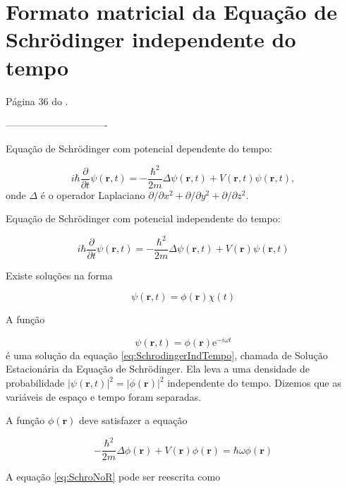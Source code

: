 \chapter{Formato matricial da Equação de Schrödinger independente do tempo}

Página 36 do \cite{Cohen1}.

-------------------------------

Equação de Schrödinger com potencial dependente do tempo:
	
	\begin{equation}
		i\hbar\frac{\partial}{\partial t} \psi(\textbf{r},t) =  - \frac{\hbar^2}{2m}\Delta\psi(\textbf{r},t) + V(\textbf{r},t)\psi(\textbf{r},t),
	\end{equation}
	onde $\Delta$ é o operador Laplaciano $\partial / \partial x^2 + \partial / \partial y^2 + \partial / \partial z^2$.
	
	
	Equação de Schrödinger com potencial independente do tempo:
	
	\begin{equation}\label{eq:SchrodingerIndTempo}
		i\hbar\frac{\partial}{\partial t} \psi(\textbf{r},t) =  - \frac{\hbar^2}{2m}\Delta\psi(\textbf{r},t) + V(\textbf{r})\psi(\textbf{r},t)
	\end{equation}
	
	Existe soluções na forma
	
	\begin{equation}
		\psi(\textbf{r},t) = \phi(\textbf{r})\chi(t)
	\end{equation}
	
	A função 
	
	\begin{equation}\label{eq:solucaoSchro}
		\psi(\textbf{r},t) = \phi(\textbf{r})\mbox{e}^{-i \omega t}
	\end{equation}
	é uma solução da equação \ref{eq:SchrodingerIndTempo}, chamada de Solução Estacionária da Equação de Schrödinger. Ela leva a uma densidade de probabilidade $|\psi(\textbf{r},t)|^2 = |\phi(\textbf{r})|^2$ independente do tempo. Dizemos que as variáveis de espaço e tempo foram separadas.
	
	A função $\phi(\textbf{r})$ deve satisfazer a equação
	
	\begin{equation}\label{eq:SchroNoR}
		- \frac{\hbar^2}{2m} \Delta \phi(\textbf{r}) + V(\textbf{r}) \phi(\textbf{r}) = \hbar \omega \phi(\textbf{r})
	\end{equation}
	
	A equação \ref{eq:SchroNoR} pode ser reescrita como
	
